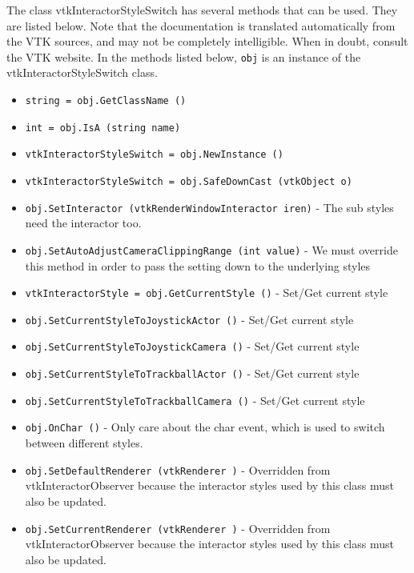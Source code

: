 The class vtkInteractorStyleSwitch has several methods that can be used.
  They are listed below.
Note that the documentation is translated automatically from the VTK sources,
and may not be completely intelligible.  When in doubt, consult the VTK website.
In the methods listed below, \verb|obj| is an instance of the vtkInteractorStyleSwitch class.
\begin{itemize}
\item  \verb|string = obj.GetClassName ()|

\item  \verb|int = obj.IsA (string name)|

\item  \verb|vtkInteractorStyleSwitch = obj.NewInstance ()|

\item  \verb|vtkInteractorStyleSwitch = obj.SafeDownCast (vtkObject o)|

\item  \verb|obj.SetInteractor (vtkRenderWindowInteractor iren)| -  The sub styles need the interactor too.

\item  \verb|obj.SetAutoAdjustCameraClippingRange (int value)| -  We must override this method in order to pass the setting down to
 the underlying styles

\item  \verb|vtkInteractorStyle = obj.GetCurrentStyle ()| -  Set/Get current style

\item  \verb|obj.SetCurrentStyleToJoystickActor ()| -  Set/Get current style

\item  \verb|obj.SetCurrentStyleToJoystickCamera ()| -  Set/Get current style

\item  \verb|obj.SetCurrentStyleToTrackballActor ()| -  Set/Get current style

\item  \verb|obj.SetCurrentStyleToTrackballCamera ()| -  Set/Get current style

\item  \verb|obj.OnChar ()| -  Only care about the char event, which is used to switch between
 different styles.

\item  \verb|obj.SetDefaultRenderer (vtkRenderer )| -  Overridden from vtkInteractorObserver because the interactor styles
 used by this class must also be updated.

\item  \verb|obj.SetCurrentRenderer (vtkRenderer )| -  Overridden from vtkInteractorObserver because the interactor styles
 used by this class must also be updated.

\end{itemize}
